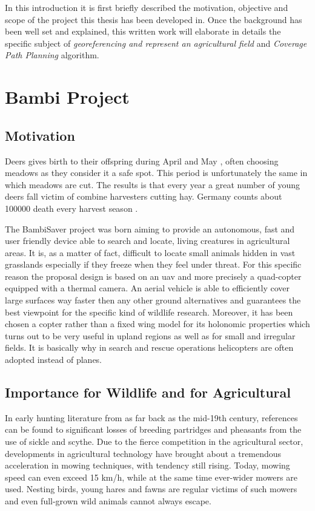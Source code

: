 


In this introduction it is first briefly described the motivation, objective and scope of the project this thesis has been developed in. Once the background has been well set and explained, this written work will elaborate in details the specific subject of \textit{georeferencing and represent an agricultural field} and \textit{Coverage Path Planning} algorithm.
\section{Bambi Project} %
\label{sec:bambi_project}

\subsection{Motivation} %
\label{ssec:motivation}
 Deers gives birth to their offspring during April and May \cite{MowlingMortality}, often choosing meadows as they consider it a safe spot. This period is unfortunately the same in which meadows are cut. The results is that every year a great number of young deers fall victim of combine harvesters cutting hay. Germany counts about 100000 death every harvest season \cite{MowlingMortality}.\par
 The BambiSaver project was born aiming to provide an autonomous, fast and user friendly device able to search and locate, living creatures in agricultural areas. It is, as a matter of fact, difficult to locate small animals hidden in vast grasslands especially if they freeze when they feel under threat. For this specific reason the proposal design is based on an \acrfull{uav}\cite{ICAO} and more precisely a quad-copter equipped with a thermal camera.
 An aerial vehicle is able to efficiently cover large surfaces way faster then any other ground alternatives and guarantees the best viewpoint for the specific kind of wildlife research. Moreover, it has been chosen a copter rather than a fixed wing model for its holonomic properties which turns out to be very useful in upland regions as well as for small and irregular fields. It is basically why in search and rescue operations helicopters are often adopted instead of planes.

\subsection{Importance for Wildlife and for Agricultural}
In early hunting literature from as far back as the mid-19th century, references can be found to significant losses of breeding partridges and pheasants from the use of sickle and scythe. Due to the fierce competition in the agricultural sector, developments in agricultural technology have brought about a tremendous acceleration in mowing techniques, with tendency still rising. Today, mowing speed can even exceed 15 km/h, while at the same time ever-wider mowers are used. Nesting birds, young hares and fawns are regular victims of such mowers and even full-grown wild animals cannot always escape.

